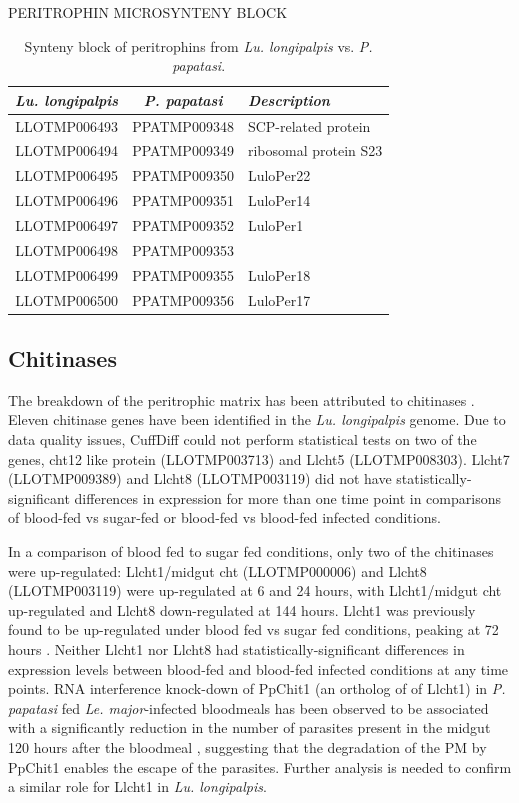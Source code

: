 \begin{table}[H]
  \centering
  \caption{PERITROPHIN MICROSYNTENY BLOCK}
  \begin{tabular}{c c l} \hline
    \emph{Lu. longipalpis} & \emph{P. papatasi} & \emph{Description} \\ \hline
    LLOTMP006493 & PPATMP009348 & SCP-related protein \\
    LLOTMP006494 & PPATMP009349 & ribosomal protein S23 \\
    LLOTMP006495 & PPATMP009350 & LuloPer22 \\
    LLOTMP006496 & PPATMP009351 & LuloPer14 \\
    LLOTMP006497 & PPATMP009352 & LuloPer1 \\
    LLOTMP006498 & PPATMP009353 &  \\
    LLOTMP006499 & PPATMP009355 & LuloPer18 \\
    LLOTMP006500 & PPATMP009356 & LuloPer17
  \end{tabular}
  \caption*{Synteny block of peritrophins from \emph{Lu. longipalpis} vs. \emph{P. papatasi}.}
  \label{tab:synteny-llot-ppat-peritrophic}
\end{table}


\subsection{Chitinases}
The breakdown of the peritrophic matrix has been attributed to chitinases \cite{Dostalova2012}. Eleven chitinase genes have been identified in the \emph{Lu. longipalpis} genome. Due to data quality issues, CuffDiff could not perform statistical tests on two of the genes, cht12 like protein (LLOTMP003713) and Llcht5 (LLOTMP008303). Llcht7 (LLOTMP009389) and Llcht8 (LLOTMP003119) did not have statistically-significant differences in expression for more than one time point in comparisons of blood-fed vs sugar-fed or blood-fed vs blood-fed infected conditions.

In a comparison of blood fed to sugar fed conditions, only two of the chitinases were up-regulated: Llcht1/midgut cht (LLOTMP000006) and Llcht8 (LLOTMP003119) were up-regulated at 6 and 24 hours, with Llcht1/midgut cht up-regulated and Llcht8 down-regulated at 144 hours.  Llcht1 was previously found to be up-regulated under blood fed vs sugar fed conditions, peaking at 72 hours \cite{Ramalho-Ortigao2003}. Neither Llcht1 nor Llcht8 had statistically-significant differences in expression levels between blood-fed and blood-fed infected conditions at any time points. RNA interference knock-down of PpChit1 (an ortholog of of Llcht1) in \emph{P. papatasi} fed \emph{Le. major}-infected bloodmeals has been observed to be associated with a significantly reduction in the number of parasites present in the midgut 120 hours after the bloodmeal \cite{Coutinho-abreu2010}, suggesting that the degradation of the PM by PpChit1 enables the escape of the parasites.  Further analysis is needed to confirm a similar role for Llcht1 in \emph{Lu. longipalpis}. 

